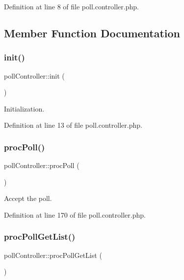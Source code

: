 Definition at line 8 of file poll.\+controller.\+php.



\subsection{Member Function Documentation}
\hypertarget{classpollController_a963891da278c1adc2400f688270342a2}{}\label{classpollController_a963891da278c1adc2400f688270342a2} 
\subsubsection{\texorpdfstring{init()}{init()}}
{\footnotesize\ttfamily poll\+Controller\+::init (\begin{DoxyParamCaption}{ }\end{DoxyParamCaption})}



Initialization. 



Definition at line 13 of file poll.\+controller.\+php.

\hypertarget{classpollController_a78770967734dc31fdfe1bba48d7e6196}{}\label{classpollController_a78770967734dc31fdfe1bba48d7e6196} 
\subsubsection{\texorpdfstring{proc\+Poll()}{procPoll()}}
{\footnotesize\ttfamily poll\+Controller\+::proc\+Poll (\begin{DoxyParamCaption}{ }\end{DoxyParamCaption})}



Accept the poll. 



Definition at line 170 of file poll.\+controller.\+php.

\hypertarget{classpollController_a7b10edf49b567e9d239c2e6bf8b12e93}{}\label{classpollController_a7b10edf49b567e9d239c2e6bf8b12e93} 
\subsubsection{\texorpdfstring{proc\+Poll\+Get\+List()}{procPollGetList()}}
{\footnotesize\ttfamily poll\+Controller\+::proc\+Poll\+Get\+List (\begin{DoxyParamCaption}{ }\end{DoxyParamCaption})}



